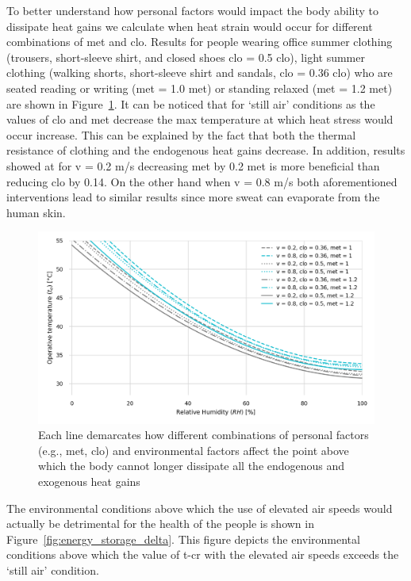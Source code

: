 To better understand how personal factors would impact the body ability to dissipate heat gains we calculate when heat strain would occur for different combinations of \ac{met} and \ac{clo}.
Results for people wearing office summer clothing (trousers, short-sleeve shirt, and closed shoes \acs{clo} = 0.5 clo), light summer clothing (walking shorts, short-sleeve shirt and sandals, \acs{clo} = 0.36 clo) who are seated reading or writing (\ac{met} = 1.0 met) or standing relaxed (\ac{met} = 1.2 met) are shown in Figure~\ref{fig:met_clo}.
It can be noticed that for `still air' conditions as the values of \ac{clo} and \ac{met} decrease the max temperature at which heat stress would occur increase.
This can be explained by the fact that both the thermal resistance of clothing and the endogenous heat gains decrease.
In addition, results showed at for \ac{v} = 0.2 m/s decreasing \ac{met} by 0.2 met is more beneficial than reducing \ac{clo} by 0.14.
On the other hand when \ac{v} = 0.8 m/s both aforementioned interventions lead to similar results since more sweat can evaporate from the human skin.

\begin{figure}[b!]
    \centering
    \includegraphics[width=\textwidth]{figures/met_clo.png}
    \caption{Each line demarcates how different combinations of personal factors (e.g., \ac{met}, \ac{clo}) and environmental factors affect the point above which the body cannot longer dissipate all the endogenous and exogenous heat gains}
    \label{fig:met_clo}
\end{figure}

The environmental conditions above which the use of elevated air speeds would actually be detrimental for the health of the people is shown in Figure~\ref{fig:energy_storage_delta}.
This figure depicts the environmental conditions above which the value of \ac{t-cr} with the elevated air speeds exceeds the `still air' condition.

